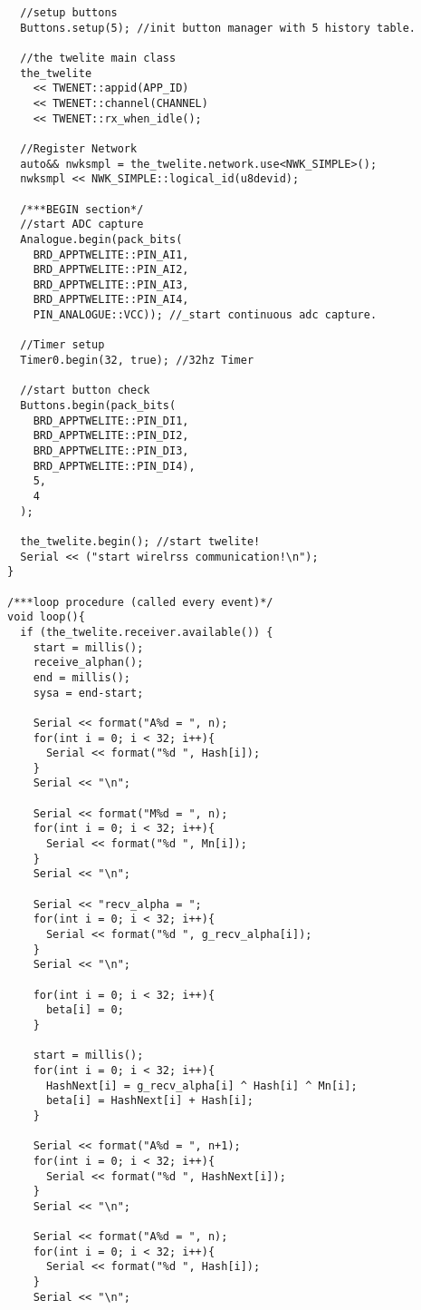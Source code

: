 \documentclass{thesis}
\begin{document}
\begin{lstlisting}
  //setup buttons
  Buttons.setup(5); //init button manager with 5 history table.

  //the twelite main class
  the_twelite
    << TWENET::appid(APP_ID)
    << TWENET::channel(CHANNEL)
    << TWENET::rx_when_idle();

  //Register Network
  auto&& nwksmpl = the_twelite.network.use<NWK_SIMPLE>();
  nwksmpl << NWK_SIMPLE::logical_id(u8devid);

  /***BEGIN section*/
  //start ADC capture
  Analogue.begin(pack_bits(
    BRD_APPTWELITE::PIN_AI1,
    BRD_APPTWELITE::PIN_AI2,
    BRD_APPTWELITE::PIN_AI3,
    BRD_APPTWELITE::PIN_AI4,
    PIN_ANALOGUE::VCC)); //_start continuous adc capture.

  //Timer setup
  Timer0.begin(32, true); //32hz Timer

  //start button check
  Buttons.begin(pack_bits(
    BRD_APPTWELITE::PIN_DI1,
    BRD_APPTWELITE::PIN_DI2,
    BRD_APPTWELITE::PIN_DI3,
    BRD_APPTWELITE::PIN_DI4),
    5,
    4
  );

  the_twelite.begin(); //start twelite!
  Serial << ("start wirelrss communication!\n");
}

/***loop procedure (called every event)*/
void loop(){
  if (the_twelite.receiver.available()) {
    start = millis();
    receive_alphan();
    end = millis();
    sysa = end-start;

    Serial << format("A%d = ", n);
    for(int i = 0; i < 32; i++){
      Serial << format("%d ", Hash[i]);
    }
    Serial << "\n";

    Serial << format("M%d = ", n);
    for(int i = 0; i < 32; i++){
      Serial << format("%d ", Mn[i]);
    }
    Serial << "\n";

    Serial << "recv_alpha = ";
    for(int i = 0; i < 32; i++){
      Serial << format("%d ", g_recv_alpha[i]);
    }
    Serial << "\n";

    for(int i = 0; i < 32; i++){
      beta[i] = 0;
    }

    start = millis();
    for(int i = 0; i < 32; i++){
      HashNext[i] = g_recv_alpha[i] ^ Hash[i] ^ Mn[i];
      beta[i] = HashNext[i] + Hash[i];
    }

    Serial << format("A%d = ", n+1);
    for(int i = 0; i < 32; i++){
      Serial << format("%d ", HashNext[i]);
    }
    Serial << "\n";

    Serial << format("A%d = ", n);
    for(int i = 0; i < 32; i++){
      Serial << format("%d ", Hash[i]);
    }
    Serial << "\n";


\end{lstlisting}
\end{document}

